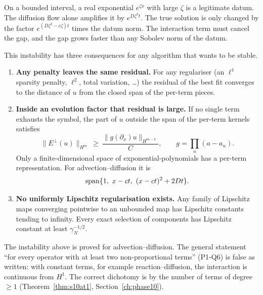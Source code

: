 \begin{intuition}
On a bounded interval, a real exponential $e^{\zeta x}$ with large $\zeta$ is a legitimate datum. The diffusion flow alone amplifies it by $e^{D\zeta^2t}$. The true solution is only changed by the factor $e^{(D\zeta^2-c\zeta)t}$ times the datum norm. The interaction term must cancel the gap, and the gap grows faster than any Sobolev norm of the datum.
\end{intuition}

This instability has three consequences for any algorithm that wants to be stable.

\begin{theorem}\label{f:thm:noreg}
\begin{enumerate}[label=(\alph*)]
\item \textbf{Any penalty leaves the same residual.} For any regulariser (an $\ell^1$ sparsity penalty, $\ell^2$, total variation, \dots) the residual of the best fit converges to the distance of $u$ from the closed span of the per-term pieces.
\item \textbf{Inside an evolution factor that residual is large.} If no single term exhausts the symbol, the part of $u$ outside the span of the per-term kernels satisfies
\[
\|E^\perp(u)\|_{H^m}\ \ge\ \frac{\|g(\partial_x)u\|_{H^{m-k}}}{C},\qquad g=\prod_n(a-a_n).
\]
Only a finite-dimensional space of exponential-polynomials has a per-term representation. For advection--diffusion it is
\[
\spn\{1,\ x-ct,\ (x-ct)^2+2Dt\}.
\]
\item \textbf{No uniformly Lipschitz regularisation exists.} Any family of Lipschitz maps converging pointwise to an unbounded map has Lipschitz constants tending to infinity. Every exact selection of components has Lipschitz constant at least $\gamma_N^{-1/2}$.
\end{enumerate}
\end{theorem}

\begin{caution}[title=Added in the complete edition (Phase 10)]
The instability above is proved for advection--diffusion. The general statement ``for every operator with at least two non-proportional terms'' (P1-Q6) is false as written: with constant terms, for example reaction--diffusion, the interaction is continuous from $H^1$. The correct dichotomy is by the number of terms of degree $\ge1$ (Theorem~\ref{thm:s10at1}, Section~\ref{ch:phase10}).
\end{caution}

